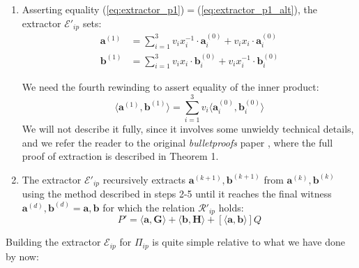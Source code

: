 \documentclass[../lecture-notes-148x210.tex]{subfiles}
\begin{document}
\begin{enumerate}
\begin{equation}
            \label{eq:extractor_p1_alt}
        \end{equation}
    \item Asserting equality (\ref{eq:extractor_p1})$=$(\ref{eq:extractor_p1_alt}), the extractor $\mathcal{E}'_{ip}$ sets:
        \begin{align}
            \mathbf{a}^{(1)} &= \sum_{i=1}^3 v_i x_i^{-1} \cdot \mathbf{a}_i^{(0)} + v_i x_i \cdot \mathbf{a}_i^{(0)} \\
            \mathbf{b}^{(1)} &= \sum_{i=1}^3 v_i x_i \cdot \mathbf{b}_i^{(0)} + v_i x_i^{-1} \cdot \mathbf{b}_i^{(0)}
        \end{align}    
    
        We need the fourth rewinding to assert equality of the inner product:
        $$\langle \mathbf{a}^{(1)}, \mathbf{b}^{(1)} \rangle = \sum_{i=1}^3 v_i \langle \mathbf{a}_i^{(0)}, \mathbf{b}_i^{(0)} \rangle$$
        We will not describe it fully, since it involves some unwieldy technical details, and we refer the reader to the original \textit{bulletproofs} paper \cite{bulletproofs}, where the full proof of extraction is described in Theorem 1.
    \item The extractor $\mathcal{E}'_{ip}$ recursively extracts $\mathbf{a}^{(k+1)}, \mathbf{b}^{(k+1)}$ from $ \mathbf{a}^{(k)}, \mathbf{b}^{(k)}$ using the method described in steps 2-5 until it reaches the final witness $\mathbf{a}^{(d)}, \mathbf{b}^{(d)} = \mathbf{a}, \mathbf{b}$ for which the relation $\mathcal{R}'_{ip}$ holds: 
    $$P' =  \langle \mathbf{a,G} \rangle + \langle \mathbf{b,H} \rangle + [\langle \mathbf{a,b} \rangle]Q$$
\end{enumerate}
Building the extractor $\mathcal{E}_{ip}$ for $\Pi_{ip}$ is quite simple relative to what we have done by now:
\end{document}
